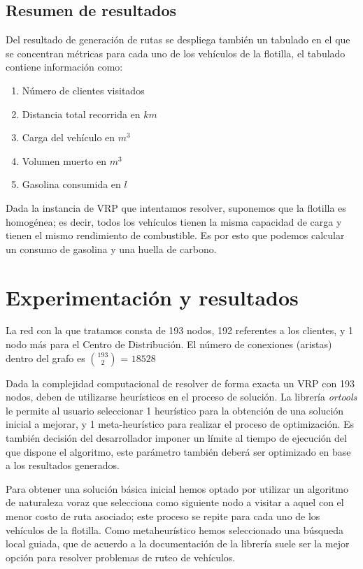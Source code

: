 \documentclass[journal]{IEEEtran}
\begin{document}
        \subsection{Resumen de resultados}

            Del resultado de generación de rutas se despliega también un tabulado en el que se concentran métricas para cada uno de los vehículos de la flotilla, el tabulado contiene información como:
            \begin{enumerate}
                \item Número de clientes visitados
                \item Distancia total recorrida en $km$
                \item Carga del vehículo en $m^{3}$
                \item Volumen muerto en $m^{3}$
                \item Gasolina consumida en $l$
            \end{enumerate}

            Dada la instancia de VRP que intentamos resolver, suponemos que la flotilla es homogénea; es decir, todos los vehículos tienen la misma capacidad de carga y tienen el mismo rendimiento de combustible. Es por esto que podemos calcular un consumo de gasolina y una huella de carbono.
            
    \section{Experimentación y resultados}
    
        La red con la que tratamos consta de 193 nodos, 192 referentes a los clientes, y 1 nodo más para el Centro de Distribución. El número de conexiones (aristas) dentro del grafo es $193\choose2$ = $18528$
        
        Dada la complejidad computacional de resolver de forma exacta un VRP con 193 nodos, deben de utilizarse heurísticos en el proceso de solución. La librería \emph{ortools} le permite al usuario seleccionar 1 heurístico para la obtención de una solución inicial a mejorar, y 1 meta-heurístico para realizar el proceso de optimización. Es también decisión del desarrollador imponer un límite al tiempo de ejecución del que dispone el algoritmo, este parámetro también deberá ser optimizado en base a los resultados generados.

        Para obtener una solución básica inicial hemos optado por utilizar un algoritmo de naturaleza voraz que selecciona como siguiente nodo a visitar a aquel con el menor costo de ruta asociado; este proceso se repite para cada uno de los vehículos de la flotilla. Como metaheurístico hemos seleccionado una búsqueda local guiada, que de acuerdo a la documentación de la librería \cite{google-2021} suele ser la mejor opción para resolver problemas de ruteo de vehículos.
\end{document}
